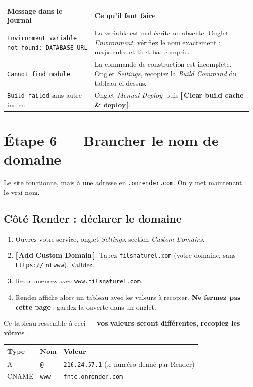 \documentclass[11pt,a4paper]{article}
\newcommand{\bouton}[1]{\textbf{\textcolor{sig}{[\,#1\,]}}}
\newcommand{\champ}[1]{\textit{#1}}
\newcommand{\saisir}[1]{\texttt{#1}}
\begin{document}
\begin{center}
\begin{tabularx}{\textwidth}{@{}lX@{}}
\toprule
\textbf{Message dans le journal} & \textbf{Ce qu'il faut faire} \\
\midrule
\saisir{Environment variable not found: DATABASE\_URL} & La variable est mal écrite ou absente. Onglet \champ{Environment}, vérifiez le nom exactement : majuscules et tiret bas compris. \\
\saisir{Cannot find module} & La commande de construction est incomplète. Onglet \champ{Settings}, recopiez la \champ{Build Command} du tableau ci-dessus. \\
\saisir{Build failed} sans autre indice & Onglet \champ{Manual Deploy}, puis \bouton{Clear build cache \& deploy}. \\
\bottomrule
\end{tabularx}
\end{center}

\section{Étape 6 — Brancher le nom de domaine}

Le site fonctionne, mais à une adresse en \saisir{.onrender.com}. On y met
maintenant le vrai nom.

\subsection{Côté Render : déclarer le domaine}

\begin{enumerate}
  \item Ouvrez votre service, onglet \champ{Settings}, section
        \champ{Custom Domains}.
  \item \bouton{Add Custom Domain}. Tapez \saisir{filsnaturel.com}
        (votre domaine, sans \saisir{https://} ni \saisir{www}). Validez.
  \item Recommencez avec \saisir{www.filsnaturel.com}.
  \item Render affiche alors un tableau avec les valeurs à recopier. \textbf{Ne
        fermez pas cette page} : gardez-la ouverte dans un onglet.
\end{enumerate}

Ce tableau ressemble à ceci — \textbf{vos valeurs seront différentes,
recopiez les vôtres} :

\begin{center}
\begin{tabularx}{\textwidth}{@{}llX@{}}
\toprule
\textbf{Type} & \textbf{Nom} & \textbf{Valeur} \\
\midrule
A & \saisir{@} & \saisir{216.24.57.1} (le numéro donné par Render) \\
CNAME & \saisir{www} & \saisir{fntc.onrender.com} \\
\bottomrule
\end{tabularx}
\end{center}
\end{document}
